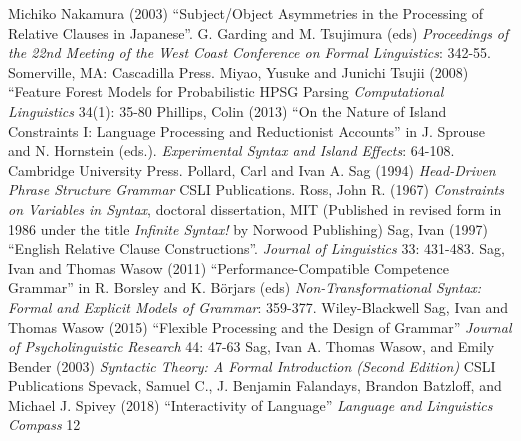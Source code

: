 \documentclass[a4paper]{article}
\begin{document}
Michiko Nakamura (2003) ``Subject/Object
Asymmetries
in the Processing
of Relative Clauses
in Japanese''.  G. Garding and M. Tsujimura (eds) {\it Proceedings of the 22nd Meeting of the West Coast Conference on Formal Linguistics}:  342-55. Somerville, MA: 
Cascadilla Press. 
\newline
\newline
Miyao, Yusuke  and Junichi Tsujii (2008) ``Feature Forest Models for
Probabilistic HPSG Parsing  {\it Computational Linguistics} 34(1): 35-80
\newline
\newline
Phillips, Colin (2013) ``On the Nature of Island Constraints I: Language Processing and Reductionist Accounts'' in
J. Sprouse and N. Hornstein (eds.).
{\it Experimental Syntax
and Island Effects}: 64-108.
Cambridge University
Press.
\newline
\newline
Pollard, Carl and Ivan A. Sag (1994) {\it Head-Driven Phrase Structure Grammar}  CSLI Publications.
\newline
\newline
Ross, John R. (1967) {\it Constraints on Variables in Syntax}, doctoral dissertation, MIT  (Published in revised form in 1986 under the title {\it Infinite Syntax!} by Norwood Publishing)
\newline
\newline
Sag, Ivan (1997) ``English Relative Clause Constructions''.  {\it Journal of
Linguistics}
33:  
431-483.
\newline
\newline
Sag, Ivan and Thomas Wasow (2011) ``Performance-Compatible Competence Grammar'' in R. Borsley and K. Börjars (eds) {\it Non-Transformational Syntax: Formal and Explicit Models of Grammar}: 359-377. Wiley-Blackwell
\newline
\newline
Sag, Ivan and Thomas Wasow (2015) ``Flexible Processing and the Design of Grammar'' {\it Journal of Psycholinguistic Research} 44: 47-63
\newline
\newline
Sag, Ivan A. Thomas Wasow, and Emily Bender (2003) {\it Syntactic Theory: A Formal Introduction (Second Edition)} CSLI Publications
\newline
\newline
Spevack, Samuel C., 
J. Benjamin Falandays,
Brandon Batzloff, and
Michael J. Spivey (2018) ``Interactivity of Language'' {\it Language and Linguistics Compass} 12
\newline
\end{document}
